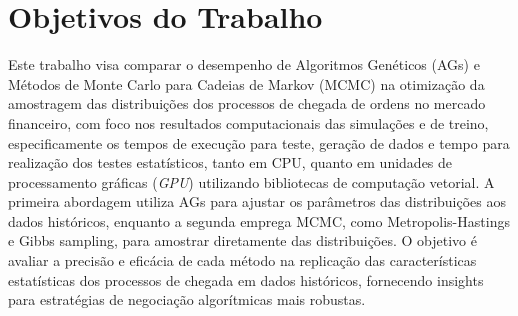 \chapter{Objetivos do Trabalho}
Este trabalho visa comparar o desempenho de Algoritmos Genéticos (AGs) e Métodos de Monte Carlo para Cadeias de Markov (MCMC) na otimização da amostragem das distribuições dos processos de chegada de ordens no mercado financeiro, com foco nos resultados computacionais das simulações e de treino, especificamente os tempos de execução para teste, geração de dados e tempo para realização dos testes estatísticos, tanto em CPU, quanto em unidades de processamento gráficas (\textit{GPU}) utilizando bibliotecas de computação vetorial. A primeira abordagem utiliza AGs para ajustar os parâmetros das distribuições aos dados históricos, enquanto a segunda emprega MCMC, como Metropolis-Hastings e Gibbs sampling, para amostrar diretamente das distribuições. O objetivo é avaliar a precisão e eficácia de cada método na replicação das características estatísticas dos processos de chegada em dados históricos, fornecendo insights para estratégias de negociação algorítmicas mais robustas.